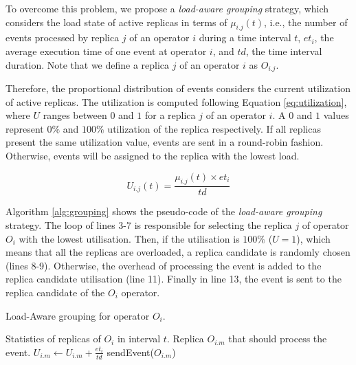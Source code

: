 To overcome this problem, we propose a \textit{load-aware grouping} strategy, which considers the load state of active replicas in terms of $\mu_{i.j}(t)$, i.e., the number of events processed by replica $j$ of an operator $i$ during a time interval $t$, $et_i$, the average execution time of one event at operator $i$, and $td$, the time interval duration. Note that we define a replica $j$ of an operator $i$ as $O_{i.j}$.

Therefore, the proportional distribution of events considers the current utilization of active replicas. The utilization is computed following Equation \ref{eq:utilization}, where $U$ ranges between $0$ and $1$ for a replica $j$ of an operator $i$. A $0$ and $1$ values represent $0\%$ and $100\%$ utilization of the replica respectively. If all replicas present the same utilization value, events are sent in a round-robin fashion. Otherwise, events will be assigned to the replica with  the lowest load.

\begin{equation}
\label{eq:utilization}
    U_{i.j}(t) = \frac{\mu_{i.j}(t) \times et_i}{td}
\end{equation}

Algorithm \ref{alg:grouping} shows the pseudo-code of the \textit{load-aware grouping} strategy. The loop of lines 3-7 is responsible for selecting the replica $j$ of operator $O_i$ with the lowest utilisation. Then, if the utilisation is $100\%$ ($U=1$), which means that all the replicas are overloaded, a replica candidate is randomly chosen (lines 8-9). Otherwise, the overhead of processing the event is added to the replica candidate utilisation (line 11). Finally in line 13, the event is sent to the replica candidate of the $O_i$ operator.

\begin{algorithm}
\caption{Load-Aware grouping for operator $O_i$.}
\begin{algorithmic}[1]
 	\REQUIRE Statistics of replicas of $O_{i}$ in interval $t$.
 	\ENSURE Replica $O_{i.m}$ that should process the event.
 	    \ENDIF
 	\ENDFOR
  	\ELSE
  	    \STATE $U_{i.m} \gets U_{i.m} + \frac{et_i}{td}$  
 	\ENDIF
 	\STATE sendEvent($O_{i.m}$)
\end{algorithmic}
\label{alg:grouping}
\end{algorithm}